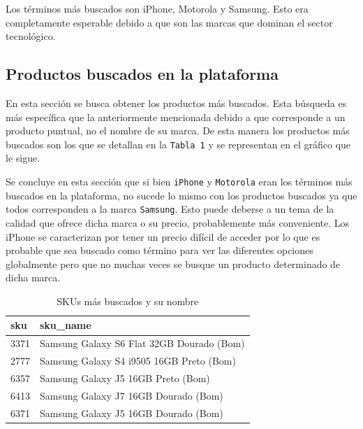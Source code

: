 \documentclass[a4paper]{article}
\begin{document}
Los términos más buscados son iPhone, Motorola y Samsung. Esto era completamente esperable debido a que son las marcas que dominan el sector tecnológico.

\subsection{Productos buscados en la plataforma}

En esta sección se busca obtener los productos más buscados. Esta búsqueda es más específica que la anteriormente mencionada debido a que corresponde a un producto puntual, no el nombre de su marca. De esta manera los productos más buscados son los que se detallan en la \texttt{Tabla 1} y se representan en el gráfico que le sigue.

Se concluye en esta sección que si bien \texttt{iPhone} y \texttt{Motorola} eran los términos más buscados en la plataforma, no sucede lo mismo con los productos buscados ya que todos corresponden a la marca \texttt{Samsung}. Esto puede deberse a un tema de la calidad que ofrece dicha marca o su precio, probablemente más conveniente. Los iPhone se caracterizan por tener un precio difícil de acceder por lo que es probable que sea buscado como término para ver las diferentes opciones globalmente pero que no muchas veces se busque un producto determinado de dicha marca.

\begin{table}[h!]
	\begin{center}
		\begin{tabular}{|l|l|}
			\hline
			sku & sku\_name \\
			\hline \hline
			3371 & Samsung Galaxy S6 Flat 32GB Dourado (Bom) \\ \hline			
			2777 & Samsung Galaxy S4 i9505 16GB Preto (Bom) \\ \hline
			6357 & Samsung Galaxy J5 16GB Preto (Bom) \\ \hline
			6413 & Samsung Galaxy J7 16GB Dourado (Bom) \\ \hline
			6371 & Samsung Galaxy J5 16GB Dourado (Bom) \\ \hline
		\end{tabular}
		\caption{SKUs más buscados y su nombre}
		\label{tabla:sencilla}
	\end{center}
\end{table}
\end{document}
